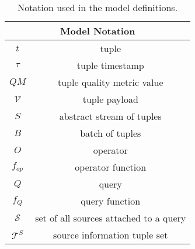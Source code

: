 \begin{table}[t!]
\centering
\begin{tabular}{|c||c|} \hline
\multicolumn{2}{|c|}{{\bf Model Notation}} \\ \hline \hline
$t$                     & tuple\\ \hline
$\tau$	           		& tuple timestamp  \\ \hline
$QM$               		& tuple quality metric value \\ \hline
$\mathcal{V}$       	& tuple payload \\ \hline
$S$						& abstract stream of tuples \\ \hline
$B$						& batch of tuples \\ \hline
$O$         		    & operator \\ \hline
$f_{op}$                  & operator function \\ \hline
$Q$			            & query \\ \hline
$f_{Q}$                  & query function \\ \hline
$\mathcal{S}$          & set of all sources attached to a query \\ \hline
$\mathcal{T}^{S}$      & source information tuple set  \\ \hline
\end{tabular}
\caption{Notation used in the model definitions.\label{table:query}}
\label{tab:notation}
\end{table}